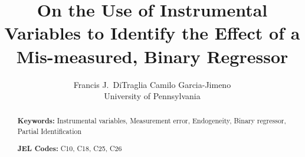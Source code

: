 \documentclass[12pt]{article}
\title{On the Use of Instrumental Variables to Identify the Effect of a Mis-measured, Binary Regressor}
\author{Francis J.\ DiTraglia  \hspace{2em} Camilo Garcia-Jimeno\\
\normalsize University of Pennsylvania}
\begin{document}
\maketitle


\begin{abstract}
  \singlespacing
	

  	\bigskip
	\noindent\textbf{Keywords:} Instrumental variables, Measurement error, Endogeneity, Binary regressor, Partial Identification

	\medskip
  \noindent\textbf{JEL Codes:} C10, C18, C25, C26
\end{abstract}



%
%
%

%
%




%
\end{document}
